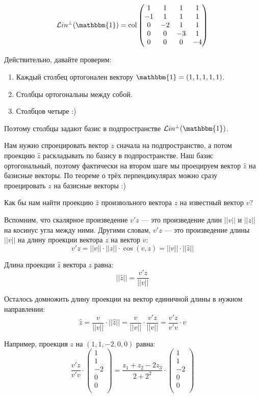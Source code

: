 \documentclass[11pt,russian,]{article}
\newcommand{\1}{\mathbbm{1}}
\newcommand{\Lin}{\mathcal{L}in}
\newcommand{\Linp}{\Lin^{\perp}}
\newcommand{\col}{\mathcal{col}}
\renewcommand{\col}{\mathrm{col}}
\begin{document}
\[
\Linp (\1) = \col \begin{pmatrix}
1  & 1  & 1  & 1  \\ 
-1 & 1  & 1  & 1  \\
0  & -2 & 1  & 1  \\
0  & 0  & -3 & 1  \\
0  & 0  & 0  & -4  \\
\end{pmatrix}
\]

Действительно, давайте проверим:

\begin{enumerate}
\def\labelenumi{\arabic{enumi}.}
\item
  Каждый столбец ортогонален вектору \(\1 = (1, 1, 1, 1, 1)\).
\item
  Столбцы ортогональны между собой.
\item
  Столбцов четыре :)
\end{enumerate}

Поэтому столбцы задают базис в подпространстве \(\Linp (\1)\).

Нам нужно спроецировать вектор \(z\) сначала на подпространство, а потом
проекцию \(\hat z\) раскладывать по базису в подпространстве. Наш базис
ортогональный, поэтому фактически на втором шаге мы проецируем вектор
\(\hat z\) на базисные векторы. По теореме о трёх перпендикулярах можно
сразу проецировать \(z\) на базисные векторы :)

Как бы нам найти проекцию \(\hat z\) произвольного вектора \(z\) на
известный вектор \(v\)?

Вспомним, что скалярное произведение \(v'z\) --- это произведение длин
\(||v||\) и \(||z||\) на косинус угла между ними. Другими словам,
\(v'z\) --- это произведение длины \(||v||\) на длину проекции вектора
\(z\) на вектор \(v\): \[
v'z = ||v||\cdot ||z||\cdot \cos(v, z) = ||v||\cdot ||\hat z||
\]

Длина проекции \(\hat z\) вектора \(z\) равна: \[
||\hat z|| = \frac{v'z}{||v||}
\]

Осталось домножить длину проекции на вектор единичной длины в нужном
направлении: \[
\hat z = \frac{v}{||v||} \cdot ||\hat z|| = \frac{v}{||v||} \cdot \frac{v'z}{||v||} =  \frac{v'z}{v'v} \cdot v
\]

Например, проекция \(z\) на \((1, 1, -2, 0, 0)\) равна: \[
\frac{v'z}{v'v} \cdot \begin{pmatrix}
1 \\
1 \\
-2 \\
0 \\
0 \\
\end{pmatrix} = 
\frac{z_1 + z_2 - 2z_3}{2+2^2} \cdot \begin{pmatrix}
1 \\
1 \\
-2 \\
0 \\
0 \\
\end{pmatrix}
\]
\end{document}
